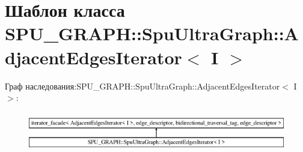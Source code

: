 \hypertarget{class_s_p_u___g_r_a_p_h_1_1_spu_ultra_graph_1_1_adjacent_edges_iterator}{}\section{Шаблон класса S\+P\+U\+\_\+\+G\+R\+A\+PH\+:\+:Spu\+Ultra\+Graph\+:\+:Adjacent\+Edges\+Iterator$<$ I $>$}
\label{class_s_p_u___g_r_a_p_h_1_1_spu_ultra_graph_1_1_adjacent_edges_iterator}
Граф наследования\+:S\+P\+U\+\_\+\+G\+R\+A\+PH\+:\+:Spu\+Ultra\+Graph\+:\+:Adjacent\+Edges\+Iterator$<$ I $>$\+:\begin{figure}[H]
\begin{center}
\leavevmode
\includegraphics[height=1.741835cm]{class_s_p_u___g_r_a_p_h_1_1_spu_ultra_graph_1_1_adjacent_edges_iterator}
\end{center}
\end{figure}

